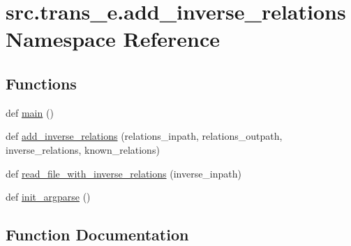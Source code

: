 \hypertarget{namespacesrc_1_1trans__e_1_1add__inverse__relations}{}\section{src.\+trans\+\_\+e.\+add\+\_\+inverse\+\_\+relations Namespace Reference}
\label{namespacesrc_1_1trans__e_1_1add__inverse__relations}
\subsection*{Functions}
\begin{DoxyCompactItemize}
\item 
def \hyperlink{namespacesrc_1_1trans__e_1_1add__inverse__relations_ae2040de364f15c60a1a2c168367e337e}{main} ()
\item 
def \hyperlink{namespacesrc_1_1trans__e_1_1add__inverse__relations_a03402ca950867cd5ca9c694f086f11b4}{add\+\_\+inverse\+\_\+relations} (relations\+\_\+inpath, relations\+\_\+outpath, inverse\+\_\+relations, known\+\_\+relations)
\item 
def \hyperlink{namespacesrc_1_1trans__e_1_1add__inverse__relations_a7fcb1b15410f783f750d1d7307777712}{read\+\_\+file\+\_\+with\+\_\+inverse\+\_\+relations} (inverse\+\_\+inpath)
\item 
def \hyperlink{namespacesrc_1_1trans__e_1_1add__inverse__relations_ada1392d9a29eff118cfae4e92ecef365}{init\+\_\+argparse} ()
\end{DoxyCompactItemize}


\subsection{Function Documentation}

